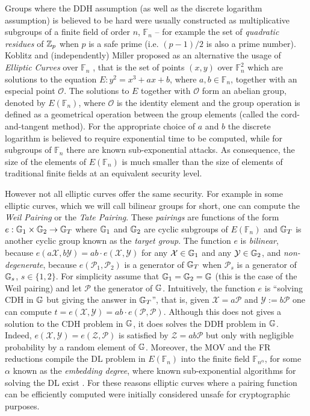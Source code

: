 Groups where the DDH assumption (as well as the discrete logarithm assumption) is believed to be hard were usually constructed as multiplicative subgroups of a finite field of order $n$, $\mathbb{F}_n$ -- for example the set of \emph{quadratic residues} of $\mathbb{Z}_p$ when $p$ is a safe prime (i.e. $(p-1)/2$ is also a prime number).
Koblitz and (independently) Miller proposed as an alternative the usage of \emph{Elliptic Curves} over $\mathbb{F}_n$ \cite{MOC:Koblitz87,C:Miller85}, that is the set of points $(x,y)$ over $\mathbb{F}_n^2$ which are solutions to the equation $E:y^2=x^3+ax+b$, where $a,b\in\mathbb{F}_n$, together with an especial point $\mathcal{O}$. The solutions to $E$ together with $\mathcal{O}$ form an abelian group, denoted by $E(\mathbb{F}_n)$, where $\mathcal{O}$ is the identity element and the group operation is defined as a geometrical operation between the group elements (called the cord-and-tangent method). For the appropriate choice of $a$ and $b$ the discrete logarithm is believed to require exponential time to be computed, while for subgroups of $\mathbb{F}_n$  there are known sub-exponential attacks. As consequence, the size of the elements of $E(\mathbb{F}_n)$ is much smaller than the size of elements of traditional finite fields at an equivalent security level.

However not all elliptic curves offer the same security. For example in some elliptic curves, which we will call bilinear groups for short, one can compute the \emph{Weil Pairing} or the \emph{Tate Pairing}. These \emph{pairings} are functions of the form $e:\mathbb{G}_1\times\mathbb{G}_2\to\mathbb{G}_T$ where $\mathbb{G}_1$ and $\mathbb{G}_2$ are cyclic subgroups of $E(\mathbb{F}_n)$ and $\mathbb{G}_T$ is another cyclic group known as the \emph{target group}. The function $e$ is \emph{bilinear}, because $e(a\mathcal{X},b\mathcal{Y})=ab\cdot e(\mathcal{X},\mathcal{Y})$ for any $\mathcal{X}\in\mathbb{G}_1$ and any $\mathcal{Y}\in\mathbb{G}_2$, and \emph{non-degenerate}, because $e(\mathcal{P}_1,\mathcal{P}_2)$ is a generator of $\mathbb{G}_T$ when $\mathcal{P}_s$ is a generator of $\mathbb{G}_s$, $s\in\{1,2\}$. For simplicity assume that $\mathbb{G}_1=\mathbb{G}_2=\mathbb{G}$ (this is the case of the Weil pairing) and let $\mathcal{P}$ the generator of $\mathbb{G}$. Intuitively, the function $e$ is ``solving CDH in $\mathbb{G}$ but giving the answer in $\mathbb{G}_T$'', that is, given $\mathcal{X}=a\mathcal{P}$ and $\mathcal{Y}:=b\mathcal{P}$ one can compute $t=e(\mathcal{X},\mathcal{Y})=ab\cdot e(\mathcal{P},\mathcal{P})$. Although this does not gives a solution to the CDH problem in $\mathbb{G}$, it does solves the DDH problem in $\mathbb{G}$. Indeed, $e(\mathcal{X},\mathcal{Y})=e(\mathcal{Z},\mathcal{P})$ is satisfied by $\mathcal{Z}=ab\mathcal{P}$ but only with negligible probability by a random element of $\mathbb{G}$. 
Moreover, the MOV and the FR reductions compile the DL problem in $E(\mathbb{F}_n)$ into the finite field $\mathbb{F}_{n^\alpha}$, for some $\alpha$ known as the \emph{embedding degree}, where known sub-exponential algorithms for solving the DL exist \cite{STOC:MenVanOka91,MOC:FreRuc94}.
For these reasons elliptic curves where a pairing function can be efficiently computed were initially considered unsafe for cryptographic purposes.

